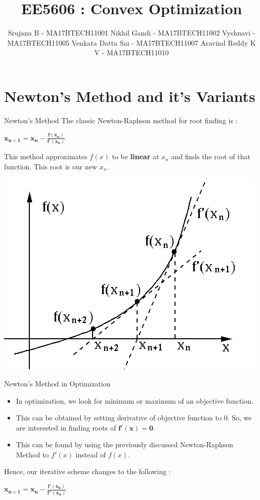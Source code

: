 \documentclass[10pt]{beamer}
\title{EE5606 : Convex Optimization}
\date{}
\author{Srujana B - MA17BTECH11001 \newline Nikhil Gandi - MA17BTECH11002 \newline Vyshnavi - MA17BTECH11005 \newline Venkata Datta Sai - MA17BTECH11007 \newline Aravind Reddy K V - MA17BTECH11010}
\institute{Mathematics and Computing, IIT-Hyderabad}
\begin{document}
\maketitle

\section{Newton's Method and it's Variants}
\begin{frame}[fragile]{Newton's Method}
The classic Newton-Raphson method for root finding is : \newline
\begin{center}
    $\boldsymbol{x_{n+1} = x_n - \frac{f(x_n)}{f'(x_n)}}$
\end{center}
This method approximates $f(x)$ to be \textbf{linear} at $x_n$ and finds the root of that function. This root is our new $x_n$.
\begin{center}
    \graphicspath{ {./images/} }
    \includegraphics [scale=0.35] {NR}
\end{center}
\end{frame}

\begin{frame}[fragile]{Newton's Method in Optimization}
 \begin{itemize}
     \item In optimization, we look for minimum or maximum of an objective function.
     \vspace{3mm}
     \item This can be obtained by setting derivative of objective function to 0. So, we are interested in finding roots of $\boldsymbol{f'(x)=0}$. 
      \vspace{3mm}
     \item This can be found by using the previously discussed Newton-Raphson Method to $f'(x)$ instead of $f(x)$.
   \end{itemize}
Hence, our iterative scheme changes to the following : \newline
\begin{center}
    $\boldsymbol{x_{n+1} = x_n - \frac{f'(x_n)}{f''(x_n)}}$ 
\end{center}
\end{frame}
\end{document}
